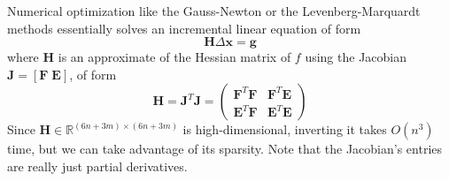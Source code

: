 \documentclass{article}
\theoremstyle{definition}
\theoremstyle{remark}
\theoremstyle{definition}
\begin{document}
Numerical optimization like the Gauss-Newton or the Levenberg-Marquardt methods essentially solves an incremental linear equation of form 
\[\mathbf{H} \Delta \mathbf{x} = \mathbf{g}\]
where $\mathbf{H}$ is an approximate of the Hessian matrix of $f$ using the Jacobian $\mathbf{J} = [ \mathbf{F}\; \mathbf{E}]$, of form 
\[\mathbf{H} = \mathbf{J}^T \mathbf{J} = \begin{pmatrix}
\mathbf{F}^T \mathbf{F} & \mathbf{F}^T \mathbf{E} \\ \mathbf{E}^T \mathbf{F} & \mathbf{E}^T \mathbf{E} \end{pmatrix}\]
Since $\mathbf{H} \in \mathbb{R}^{(6n + 3m) \times (6n + 3m)}$ is high-dimensional, inverting it takes $O(n^3)$ time, but we can take advantage of its sparsity. Note that the Jacobian's entries are really just partial derivatives. 
\end{document}

